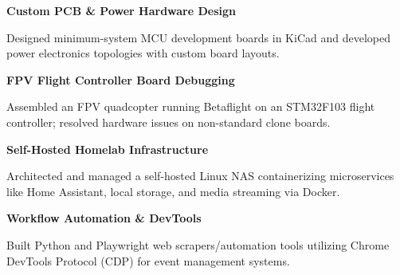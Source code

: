 \documentclass[10pt,a4paper]{article}
\newcommand{\entrytitle}[1]{%
\textbf{#1}\par
}
\begin{document}
\begin{minipage}[t]{0.47\textwidth}
\entrytitle{Custom PCB \& Power Hardware Design}
\small
Designed minimum-system MCU development boards in KiCad and developed power electronics topologies with custom board layouts.
\vspace{0.4em}

\entrytitle{FPV Flight Controller Board Debugging}
\small
Assembled an FPV quadcopter running Betaflight on an STM32F103 flight controller; resolved hardware issues on non-standard clone boards.
\vspace{0.4em}

\entrytitle{Self-Hosted Homelab Infrastructure}
\small
Architected and managed a self-hosted Linux NAS containerizing microservices like Home Assistant, local storage, and media streaming via Docker.
\vspace{0.4em}

\entrytitle{Workflow Automation \& DevTools}
\small
Built Python and Playwright web scrapers/automation tools utilizing Chrome DevTools Protocol (CDP) for event management systems.

\end{minipage}
\hfill
\end{document}
